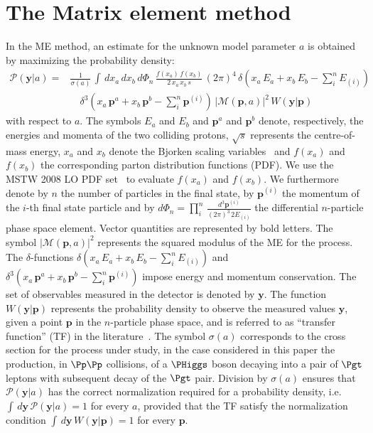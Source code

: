 \section{The Matrix element method}
\label{sec:mem}

In the ME method, an estimate for the unknown model parameter $a$
is obtained by maximizing the probability density:
\begin{align}
\mathcal{P}(\bm{y}|a) = & \frac{1}{\sigma(a)} \, \int \, dx_{a} \, dx_{b} \,
d\Phi_{n} \, \frac{f(x_{a}) \, f(x_{b})}{2 \, x_{a} \, x_{b} \, s} \, (2\pi)^{4} \,
\delta( x_{a} \, E_{a} + x_{b} \, E_{b} - \sum_{i}^{n}
E_{(i)}) \, \nonumber \\
 & \quad \delta^{3}( x_{a} \, \bm{p}^{a} + x_{b} \, \bm{p}^{b} - \sum_{i}^{n}
\bm{p}^{(i)}) \, 
  \vert \mathcal{M}(\bm{p},a) \vert^{2} \, W(\bm{y}|\bm{p}) 
\label{eq:mem}
\end{align}
with respect to $a$.
The symbols $E_{a}$ and $E_{b}$ and $\bm{p}^{a}$ and $\bm{p}^{b}$ denote, respectively, the energies and momenta of the two colliding protons,
$\sqrt{s}$ represents the centre-of-mass energy,
$x_{a}$ and $x_{b}$ denote the Bjorken scaling variables~\cite{Bjorkenx}
and $f(x_{a})$ and $f(x_{b})$ the corresponding parton distribution
functions (PDF).
We use the MSTW 2008 LO PDF set~\cite{MSTW} to evaluate $f(x_{a})$ and $f(x_{b})$.
We furthermore denote by $n$ the number of particles in the final state,
by $\bm{p}^{(i)}$ the momentum of the $i$-th final state particle
and by $d\Phi_{n} = \prod_{i}^{n} \,
\frac{d^{3}\bm{p}^{(i)}}{(2\pi)^{3} \, 2 E_{(i)}}$ the differential $n$-particle
phase space element.
Vector quantities are represented by bold letters.
The symbol $\vert \mathcal{M}(\bm{p},a) \vert^{2}$ represents the
squared modulus of the ME for
the process.
The $\delta$-functions $\delta( x_{a} \, E_{a} + x_{b} \, E_{b} - \sum_{i}^{n} E_{(i)})$
and $\delta^{3}( x_{a} \, \bm{p}^{a} + x_{b} \, \bm{p}^{b} - \sum_{i}^{n} \bm{p}^{(i)})$ 
impose energy and momentum conservation.
The set of observables measured in the
detector is denoted by $\bm{y}$.
The function $W(\bm{y}|\bm{p})$ represents the probability density to
observe the measured values $\bm{y}$, given a point $\bm{p}$ in the
$n$-particle phase space, and
is referred to as ``transfer function'' (TF) in the
literature~\cite{Fiedler:2010sg,Volobouev:2011vb}.
The symbol $\sigma(a)$ corresponds to the cross section for the process under study,
in the case considered in this paper the production, in $\Pp\Pp$
collisions, of a $\PHiggs$ boson decaying into a pair of $\Pgt$ leptons
with subsequent decay of the $\Pgt$ pair.
Division by $\sigma(a)$ ensures that $\mathcal{P}(\bm{y}|a)$ has
the correct normalization required for a probability density, 
i.e. $\int \, d\bm{y} \, \mathcal{P}(\bm{y}|a) = 1$ for every $a$, 
provided that the TF satisfy the normalization condition
$\int \, d\bm{y}\, W(\bm{y}|\bm{p}) = 1$
for every $\bm{p}$.

